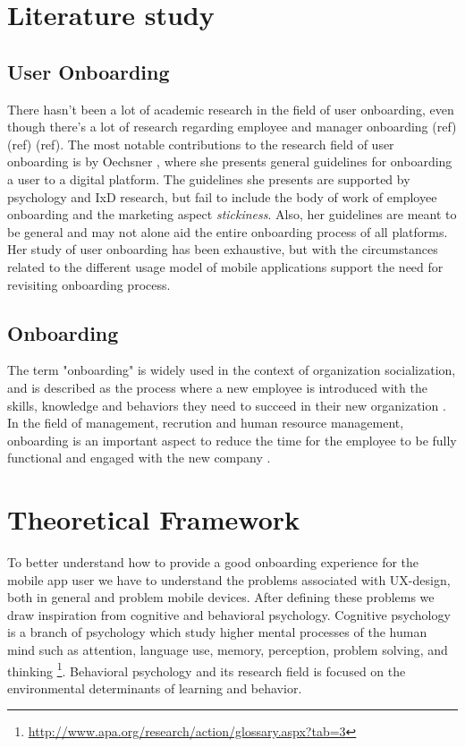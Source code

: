 \section{Literature study}
\subsection{User Onboarding}
There hasn't been a lot of academic research in the field of user onboarding, even though there's a lot of research regarding employee and manager onboarding (ref) (ref) (ref). The most notable contributions to the research field of user onboarding is by Oechsner \cite{Oechsner2016}, where she presents general guidelines for onboarding a user to a digital platform. The guidelines she presents are supported by psychology and IxD research, but fail to include the body of work of employee onboarding and the marketing aspect \textit{stickiness}. Also, her guidelines are meant to be general and may not alone aid the entire onboarding process of all platforms. Her study of user onboarding has been exhaustive, but with the circumstances related to the different usage model of mobile applications support the need for revisiting onboarding process.

\subsection{Onboarding}

The term "onboarding" is widely used in the context of organization socialization, and is described as the process where a new employee is introduced with the skills, knowledge and behaviors they need to succeed in their new organization \cite{Bauer2011}. In the field of management, recrution and human resource management, onboarding is an important aspect to reduce the time for the employee to be fully functional and engaged with the new company \cite{GraybillJolieO;HudsonCarpenterMariaTaesil;OffordJeromeJr;PiorunMary;Shaffer2013}.

\section{Theoretical Framework}

To better understand how to provide a good onboarding experience for the mobile app user we have to understand the problems associated with UX-design, both in general and problem mobile devices. After defining these problems we draw inspiration from cognitive and behavioral psychology. Cognitive psychology is a branch of psychology which study higher mental processes of the human mind such as attention, language use, memory, perception, problem solving, and thinking \footnote{\url{http://www.apa.org/research/action/glossary.aspx?tab=3}}. Behavioral psychology and its research field is focused on the environmental determinants of learning and behavior.

